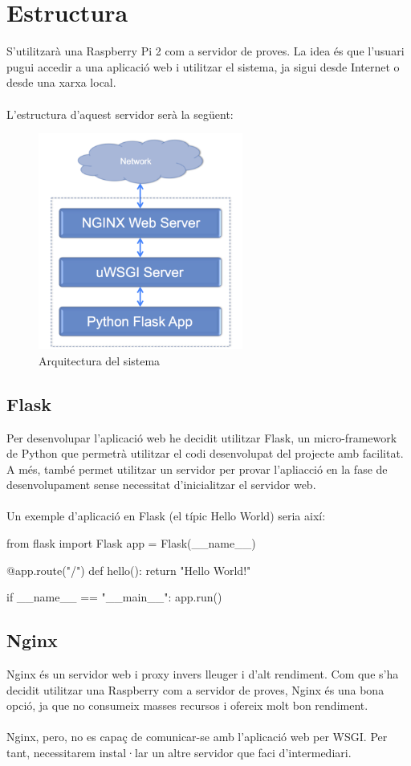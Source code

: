 \section{Estructura}
	S'utilitzarà una Raspberry Pi 2 com a servidor de proves. La idea és que l'usuari pugui accedir a una aplicació web i utilitzar el sistema, ja sigui desde Internet o desde una xarxa local.\\\\
	L'estructura d'aquest servidor serà la següent:\\
	\begin{figure}[H]
			\centering
			\includegraphics[width=0.6\textwidth]{images/server}
			\caption{Arquitectura del sistema}
	\end{figure}

	\subsection{Flask}
		Per desenvolupar l'aplicació web he decidit utilitzar Flask, un micro-framework de Python que permetrà utilitzar el codi desenvolupat del projecte amb facilitat.
		A més, també permet utilitzar un servidor per provar l'apliacció en la fase de desenvolupament sense necessitat d'inicialitzar el servidor web.\\\\
		Un exemple d'aplicació en Flask (el típic Hello World) seria així:
		\begin{python}
from flask import Flask
app = Flask(__name__)

@app.route("/")
def hello():
	return "Hello World!"

if __name__ == "__main__":
	app.run()
		\end{python}
	\subsection{Nginx}
		Nginx és un servidor web i proxy invers lleuger i d'alt rendiment. Com que s'ha decidit utilitzar una Raspberry com a servidor de proves, Nginx és una bona opció, ja que no consumeix masses recursos
		i ofereix molt bon rendiment.\\\\
		Nginx, pero, no es capaç de comunicar-se amb l'aplicació web per WSGI. Per tant, necessitarem instal·lar un altre servidor que faci d'intermediari.
